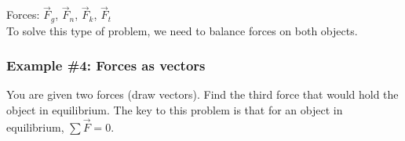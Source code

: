 Forces: $\vec{F}_g$, $\vec{F}_n$, $\vec{F}_k$, $\vec{F}_t$\\
To solve this type of problem, we need to balance forces on both objects.

\vspace{4cm}


\subsubsection*{Example \#4: Forces as vectors}
You are given two forces (draw vectors). Find the third force that would hold the object in equilibrium. The key to this problem is that for an object in equilibrium, $\sum \vec F=0$.

\clearpage
